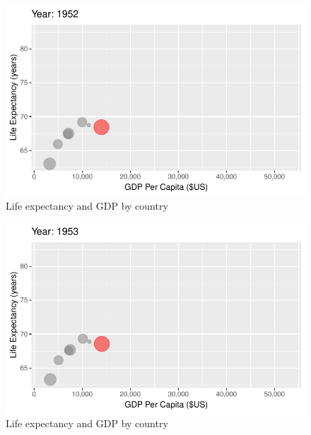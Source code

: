 \documentclass[
  letterpaper,
  DIV=11,
  numbers=noendperiod]{scrreport}
\theoremstyle{definition}
\theoremstyle{remark}
\begin{document}
\begin{figure}

{\centering \includegraphics{index_files/figure-pdf/fig-anim-country-1.pdf}

}

\caption{\label{fig-anim-country-1}Life expectancy and GDP by country}

\end{figure}

\begin{figure}

{\centering \includegraphics{index_files/figure-pdf/fig-anim-country-2.pdf}

}

\caption{\label{fig-anim-country-2}Life expectancy and GDP by country}

\end{figure}
\end{document}
